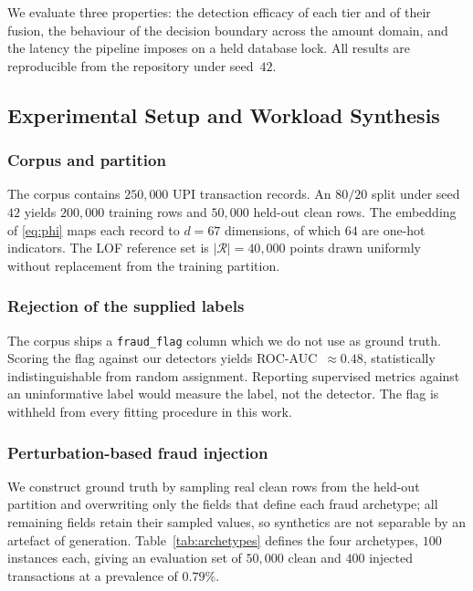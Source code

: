 \documentclass[conference]{IEEEtran}
\begin{document}
We evaluate three properties: the detection efficacy of each tier and
of their fusion, the behaviour of the decision boundary across the
amount domain, and the latency the pipeline imposes on a held database
lock. All results are reproducible from the repository under seed~$42$.

\subsection{Experimental Setup and Workload Synthesis}
\label{subsec:setup}

\subsubsection{Corpus and partition}
The corpus contains $250{,}000$ UPI transaction records. An $80/20$
split under seed~$42$ yields $200{,}000$ training rows and $50{,}000$
held-out clean rows. The embedding of \eqref{eq:phi} maps each record
to $d=67$ dimensions, of which $64$ are one-hot indicators. The LOF
reference set is $|\mathcal{R}| = 40{,}000$ points drawn uniformly
without replacement from the training partition.

\subsubsection{Rejection of the supplied labels}
The corpus ships a \texttt{fraud\_flag} column which we do not use as
ground truth. Scoring the flag against our detectors yields
ROC-AUC~$\approx 0.48$, statistically indistinguishable from random
assignment. Reporting supervised metrics against an uninformative
label would measure the label, not the detector. The flag is withheld
from every fitting procedure in this work.

\subsubsection{Perturbation-based fraud injection}
We construct ground truth by sampling real clean rows from the
held-out partition and overwriting only the fields that define each
fraud archetype; all remaining fields retain their sampled values, so
synthetics are not separable by an artefact of generation.
Table~\ref{tab:archetypes} defines the four archetypes, $100$ instances
each, giving an evaluation set of $50{,}000$ clean and $400$ injected
transactions at a prevalence of $0.79\%$.
\end{document}
